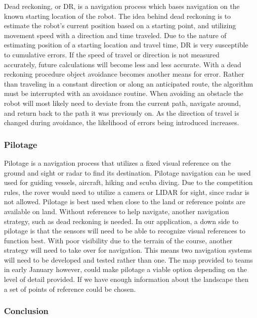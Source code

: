 \documentclass[10pt, oneside,onecolumn]{IEEEtran}
\begin{document}
\begin{titlepage}
	Dead reckoning, or DR, is a navigation process which bases navigation on the known starting location of the robot. The idea behind dead reckoning is to estimate the robot's current position based on a starting point, and utilizing movement speed with a direction and time traveled. Due to the nature of estimating position of a starting location and travel time, DR is very susceptible to cumulative errors. If the speed of travel or direction is not measured accurately, future calculations will become less and less accurate.
	With a dead reckoning procedure object avoidance becomes another means for error. Rather than traveling in a constant direction or along an anticipated route, the algorithm must be interrupted with an avoidance routine. When avoiding an obstacle the robot will most likely need to deviate from the current path, navigate around, and return back to the path it was previously on. As the direction of travel is changed during avoidance, the likelihood of errors being introduced increases. 

\subsubsection{Pilotage}

	Pilotage is a navigation process that utilizes a fixed visual reference on the ground and sight or radar to find its destination. Pilotage navigation can be used used for guiding vessels, aircraft, hiking and scuba diving. Due to the competition rules, the rover would need to utilize a camera or LIDAR for sight, since radar is not allowed. Pilotage is best used when close to the land or reference points are available on land. Without references to help navigate, another navigation strategy, such as dead reckoning is needed. In our application, a down side to pilotage is that the sensors will need to be able to recognize visual references to function best. With poor visibility due to the terrain of the course, another strategy will need to take over for navigation. This means two navigation systems will need to be developed and tested rather than one. The map provided to teams in early January however, could make pilotage a viable option depending on the level of detail provided. If we have enough information about the landscape then a set of points of reference could be chosen. 

\subsubsection{Conclusion}


\end{titlepage}
\end{document}
